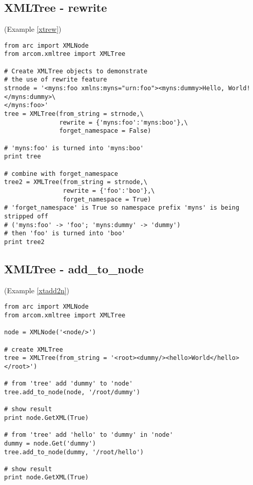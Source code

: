 \subsection{XMLTree - rewrite}
(Example \ref{xtrew})
\label{cxtrew}
\begin{verbatim}
from arc import XMLNode
from arcom.xmltree import XMLTree

# Create XMLTree objects to demonstrate
# the use of rewrite feature
strnode = '<myns:foo xmlns:myns="urn:foo"><myns:dummy>Hello, World!</myns:dummy>\
</myns:foo>'
tree = XMLTree(from_string = strnode,\
               rewrite = {'myns:foo':'myns:boo'},\
               forget_namespace = False)

# 'myns:foo' is turned into 'myns:boo'
print tree

# combine with forget_namespace
tree2 = XMLTree(from_string = strnode,\
                rewrite = {'foo':'boo'},\
                forget_namespace = True)
# 'forget_namespace' is True so namespace prefix 'myns' is being stripped off
# ('myns:foo' -> 'foo'; 'myns:dummy' -> 'dummy')
# then 'foo' is turned into 'boo' 
print tree2
\end{verbatim}

\subsection{XMLTree - add\_to\_node}
(Example \ref{xtadd2n})
\label{cxtadd2n}
\begin{verbatim}
from arc import XMLNode
from arcom.xmltree import XMLTree

node = XMLNode('<node/>')

# create XMLTree
tree = XMLTree(from_string = '<root><dummy/><hello>World</hello></root>')

# from 'tree' add 'dummy' to 'node'
tree.add_to_node(node, '/root/dummy')

# show result
print node.GetXML(True)

# from 'tree' add 'hello' to 'dummy' in 'node'
dummy = node.Get('dummy')
tree.add_to_node(dummy, '/root/hello')

# show result
print node.GetXML(True)
\end{verbatim}

